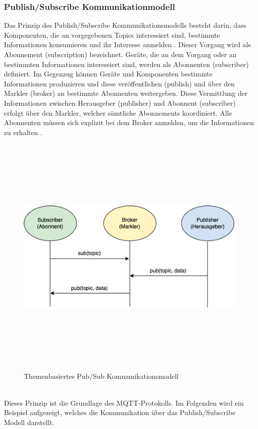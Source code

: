         \subsubsection*{Publish/Subscribe Kommunikationmodell}
        \label{subsubsec:pubsub}
            Das Prinzip des Publish/Subscribe Kommunikationsmodells besteht darin, dass Komponenten, die an vorgegebenen Topics 
            interessiert sind, bestimmte Informationen konsumieren und ihr Interesse anmelden \cite{Hunkeler2008}. Dieser Vorgang wird als 
            Abonnement (subscription) bezeichnet. Geräte, die an dem Vorgang oder an bestimmten Informationen interessiert sind, 
            werden als Abonnenten (subscriber) definiert. Im Gegenzug können Geräte und Komponenten bestimmte Informationen produzieren und 
            diese veröffentlichen (publish) und über den Markler (broker) an bestimmte Abonnenten weitergeben. Diese Vermittlung der Informationen zwischen 
            Herausgeber (publisher) und Abonnent (subscriber) erfolgt über den Markler, welcher sämtliche Abonnements koordiniert. 
            Alle Abonnenten müssen sich explizit bei dem Broker anmelden, um die Informationen zu erhalten \cite{Hunkeler2008}. 
            \\
            \linebreak
            \pagebreak
            \begin{figure}[hbt!]
                \centering
                \includegraphics[width=12cm,height=12cm,keepaspectratio]{images/sub-model.drawio.png}
                \caption{Themenbasiertes Pub/Sub Kommunikationsmodell \cite{Hunkeler2008}}
                \label{pic:pub-sub-model}
            \end{figure}
            \\
            Dieses Prinzip ist die Grundlage des \acs{MQTT}-Protokolls. Im Folgenden wird ein Beispiel aufgezeigt, welches 
            die Kommunikation über das Publish/Subscribe Modell darstellt.
            
